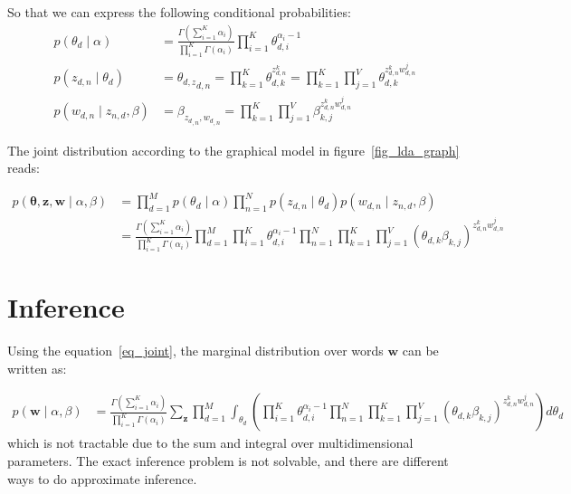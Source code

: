 \documentclass[12pt,a4paper,onecolumn]{article}
\begin{document}
\begin{multicols}{2}
	So that we can express the following conditional probabilities:
	\begin{align*}
		p(\theta_d \mid \alpha)        & = \frac{\Gamma\left(\sum_{i=1}^K \alpha_i\right)}{\prod_{i=1}^K\Gamma(\alpha_i)}\prod_{i=1}^K \theta_{d,i}^{\alpha_i -1}
		\\
		p(z_{d,n} \mid \theta_d)       & = {\theta_{d,z}}_{d,n} = \prod_{k=1}^K \theta_{d,k}^{z_{d,n}^k} =\prod_{k=1}^K \prod_{j=1}^V \theta_{d,k}^{z_{d,n}^k  w_{d,n}^j} \\
		p(w_{d,n} \mid z_{n,d}, \beta) & = \beta_{{z_d}_{,n},{w_d}_{,n}} = \prod_{k=1}^K \prod_{j=1}^V \beta_{k,j}^{z_{d,n}^k  w_{d,n}^j}
	\end{align*}



\end{multicols}

The joint distribution according to the graphical model in figure~\ref{fig_lda_graph} reads:

\begin{align}
	p(\bm{\theta}, \bm{z}, \bm{w} \mid \alpha, \beta) & = \prod_{d=1}^M p(\theta_d \mid \alpha) \prod_{n=1}^N p(z_{d,n} \mid \theta_d)p(w_{d,n} \mid z_{n,d}, \beta)                                                                                                                                 \\
	                                                  & = \frac{\Gamma\left(\sum_{i=1}^K \alpha_i\right)}{\prod_{i=1}^K\Gamma(\alpha_i)}\prod_{d=1}^M \prod_{i=1}^K \theta_{d,i}^{\alpha_i -1} \prod_{n=1}^N \prod_{k=1}^K \prod_{j=1}^V \left(\theta_{d,k}\beta_{k,j}\right)^{z_{d,n}^k  w_{d,n}^j}
	\label{eq_joint}
\end{align}

\section{Inference}

Using the equation~\eqref{eq_joint}, the marginal distribution over words \(\bm{w}\) can be written as:

\begin{align}
	p(\bm{w} \mid \alpha, \beta) & = \frac{\Gamma\left(\sum_{i=1}^K \alpha_i\right)}{\prod_{i=1}^K\Gamma(\alpha_i)}\sum_{\bm{z}}\prod_{d=1}^M\int_{\theta_d}\left( \prod_{i=1}^K \theta_{d,i}^{\alpha_i -1} \prod_{n=1}^N \prod_{k=1}^K \prod_{j=1}^V \left(\theta_{d,k}\beta_{k,j}\right)^{z_{d,n}^k  w_{d,n}^j}\right)d{\theta_d}
	\label{eq_intractable}
\end{align}
which is not tractable due to the sum and integral over multidimensional parameters. The exact inference problem is not solvable, and there are different ways to do approximate inference.
\end{document}
